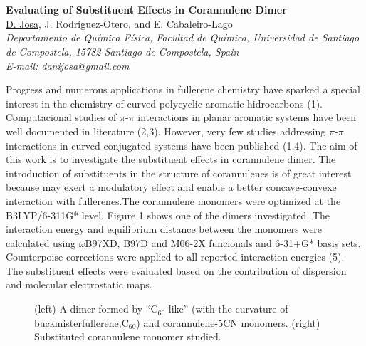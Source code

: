 \newpage
\setcounter{figure}{0}
\section*{}
\begin{center}
{\bf \Large
Evaluating of Substituent Effects in Corannulene Dimer
}
\\
\vspace{0.5cm}
\underline{D. Josa}, J. Rodríguez-Otero, and E. Cabaleiro-Lago
\\
\vspace{0.5cm}
{\it
 Departamento de Química Física, Facultad de Química, Universidad de Santiago de Compostela, 15782
                                      Santiago de Compostela, Spain
}
\\
\vspace{0.5cm}
{\it E-mail: danijosa@gmail.com }
\\
\vspace{0.5cm}
\end{center}
          Progress and numerous applications in fullerene chemistry have sparked a
special interest in the chemistry of curved polycyclic aromatic hidrocarbons (1).
Computacional studies of $\pi$-$\pi$ interactions in planar aromatic systems have been well
documented in literature (2,3). However, very few studies addressing $\pi$-$\pi$ interactions in
curved conjugated systems have been published (1,4). The aim of this work is to
investigate the substituent effects in corannulene dimer. The introduction of substituents
in the structure of corannulenes is of great interest because may exert a modulatory
effect and enable a better concave-convexe interaction with fullerenes.The corannulene
monomers were optimized at the B3LYP/6-311G* level. Figure 1 shows one of the
dimers investigated. The interaction energy and equilibrium distance between the
monomers were calculated using $\omega$B97XD, B97D and M06-2X funcionals and 6-31+G*
basis sets. Counterpoise corrections were applied to all reported interaction energies (5).
The substituent effects were evaluated based on the contribution of dispersion and
molecular electrostatic maps.
\begin{figure}[h]
 \centerline{}
 \caption[]{(left) A dimer formed by “C$_{60}$-like” (with the curvature of buckmisterfullerene,C$_{60}$) and corannulene-5CN monomers. (right) Substituted corannulene monomer studied.  }\label{figure 1}
\end{figure}
